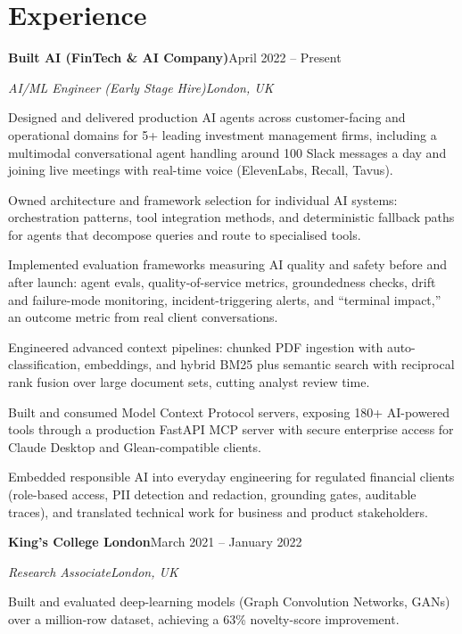 \documentclass[10pt,a4paper]{article}
\newcommand{\entry}[4]{%
  {\color{company}\bfseries #1}\hfill {\color{muted}#2}\par
  \vspace{1pt}
  {\itshape #3}\hfill {\color{muted}\itshape #4}\par
  \vspace{3pt}%
}
\begin{document}
\section{Experience}
\entry{Built AI (FinTech \& AI Company)}{April 2022 -- Present}{AI/ML Engineer (Early Stage Hire)}{London, UK}
\begin{tight}
  \item Designed and delivered production AI agents across customer-facing and operational domains for 5+ leading investment management firms, including a multimodal conversational agent handling around 100 Slack messages a day and joining live meetings with real-time voice (ElevenLabs, Recall, Tavus).
  \item Owned architecture and framework selection for individual AI systems: orchestration patterns, tool integration methods, and deterministic fallback paths for agents that decompose queries and route to specialised tools.
  \item Implemented evaluation frameworks measuring AI quality and safety before and after launch: agent evals, quality-of-service metrics, groundedness checks, drift and failure-mode monitoring, incident-triggering alerts, and ``terminal impact,'' an outcome metric from real client conversations.
  \item Engineered advanced context pipelines: chunked PDF ingestion with auto-classification, embeddings, and hybrid BM25 plus semantic search with reciprocal rank fusion over large document sets, cutting analyst review time.
  \item Built and consumed Model Context Protocol servers, exposing 180+ AI-powered tools through a production FastAPI MCP server with secure enterprise access for Claude Desktop and Glean-compatible clients.
  \item Embedded responsible AI into everyday engineering for regulated financial clients (role-based access, PII detection and redaction, grounding gates, auditable traces), and translated technical work for business and product stakeholders.
\end{tight}

\entry{King's College London}{March 2021 -- January 2022}{Research Associate}{London, UK}
\begin{tight}
  \item Built and evaluated deep-learning models (Graph Convolution Networks, GANs) over a million-row dataset, achieving a 63\% novelty-score improvement.
\end{tight}
\end{document}
